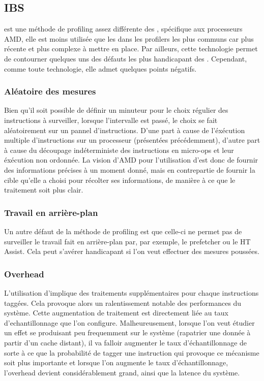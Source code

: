				\subsection{IBS}
					\IBS est une méthode de profiling assez différente des \PMC, spécifique aux processeurs AMD, elle est moins utilisée que les \PMC dans les profilers les plus communs car plus récente et plus complexe à mettre en place. Par ailleurs, cette technologie permet de contourner quelques uns des défauts les plus handicapant des \PMC. Cependant, comme toute technologie, elle admet quelques points négatifs.
					\subsubsection{Aléatoire des mesures}
						Bien qu'il soit possible de définir un minuteur pour le choix régulier des instructions à surveiller, lorsque l'intervalle est passé, le choix se fait aléatoirement sur un pannel d'instructions. D'une part à cause de l'éxécution multiple d'instructions sur un processeur (présentées précédemment), d'autre part à cause du découpage indéterministe des instructions en micro-ops et leur éxécution non ordonnée. La vision d'AMD pour l'utilisation d'\IBS est donc de fournir des informations précises à un moment donné, mais en contrepartie de fournir la cible qu'elle a choisi pour récolter ses informations, de manière à ce que le traitement soit plus clair.
					\subsubsection{Travail en arrière-plan}
						Un autre défaut de la méthode de profiling \IBS est que celle-ci ne permet pas de surveiller le travail fait en arrière-plan par, par exemple, le prefetcher ou le HT Assist. Cela peut s'avérer handicapant si l'on veut effectuer des mesures poussées.
					\subsubsection{Overhead}
						L'utilisation d'\IBS implique des traitements supplémentaires pour chaque instructions taggées. Cela provoque alors un ralentissement notable des performances du système. Cette augmentation de traitement est directement liée au taux d'echantillonnage que l'on configure. Malheureusement, lorsque l'on veut étudier un effet se produisant peu frequemment sur le système (rapatrier une donnée à partir d'un cache distant), il va falloir augmenter le taux d'échantillonnage de sorte à ce que la probabilité de tagger une instruction qui provoque ce mécanisme soit plus importante et lorsque l'on augmente le taux d'échantillonnage, l'overhead devient considérablement grand, ainsi que la latence du système.
